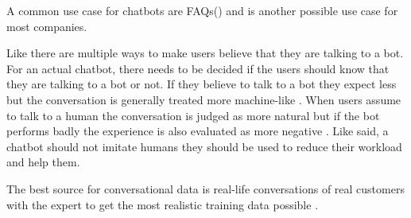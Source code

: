 A common use case for chatbots are FAQs(\citet{evaluateChatbotsShawar2007, buiildChatbotsPython, huang2007extracting, GO2019304}) 
and is another possible use case for most companies.


Like \citet{GO2019304} there are multiple ways to make users believe that they are talking to a bot.
For an actual chatbot, there needs to be decided if the users should know that they are talking to a bot or not.
If they believe to talk to a bot they expect less but the conversation is generally treated more machine-like \cite{GO2019304}.
When users assume to talk to a human the conversation is judged as more natural but if the bot performs badly the experience is also evaluated as more negative \cite{GO2019304}.
Like \citet{shawar2007chatbots} said, a chatbot should not imitate humans they should be used to reduce their workload and help them.

The best source for conversational data is real-life conversations of real customers with the expert to get the most realistic training data possible \cite{singhbuilding}.